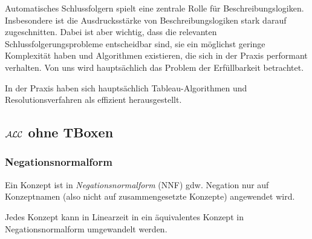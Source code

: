 Automatisches Schlussfolgern spielt eine zentrale Rolle für
Beschreibungslogiken. Insbesondere ist die Ausdrucksstärke von
Beschreibungslogiken stark darauf zugeschnitten.
Dabei ist aber wichtig, dass die relevanten Schlussfolgerungsprobleme
entscheidbar sind, sie ein möglichst geringe Komplexität haben und
Algorithmen existieren, die sich in der Praxis performant verhalten.
Von uns wird hauptsächlich das Problem der Erfüllbarkeit betrachtet.

In der Praxis haben sich hauptsächlich Tableau-Algorithmen und
Resolutionsverfahren als effizient herausgestellt.

\subsection{\texorpdfstring{$\mathcal{A}\mathcal{L}\mathcal{C}$}{ALC} ohne TBoxen}\label{alc-ohne-tboxen}

\subsubsection{Negationsnormalform}\label{negationsnormalform}

\begin{definition}[Negationsnormalform]
Ein Konzept ist in \emph{Negationsnormalform} (NNF) gdw. Negation nur auf
Konzeptnamen (also nicht auf zusammengesetzte Konzepte) angewendet wird.
\end{definition}

\begin{lemma}
Jedes Konzept kann in Linearzeit in ein äquivalentes Konzept in
Negationsnormalform umgewandelt werden.
\end{lemma}

